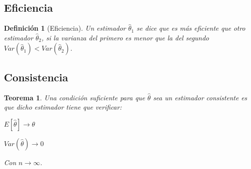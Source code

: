 \documentclass[a4paper, 10pt]{article} %
\newtheorem{theorem}{Teorema}[section]
\newtheorem{definition}{Definición}[section]
\begin{document}

\subsection{Eficiencia}
\begin{definition}[Eficiencia]
Un estimador $\hat{\theta}_1$ se dice que es más eficiente que otro estimador $\hat{\theta}_2$, si la varianza del primero es menor que la del segundo $Var(\hat{\theta}_1)<Var(\hat{\theta}_2)$.
\end{definition}

%

\subsection{Consistencia}
\begin{theorem}
Una condición suficiente para que $\hat{\theta}$ sea un estimador consistente es que dicho estimador tiene que verificar:
\begin{description}
\item $E[\hat{\theta}] \rightarrow \theta$
\item $Var(\hat{\theta}) \rightarrow 0$
\end{description}
Con $n \rightarrow \infty$.
\end{theorem}
\end{document}
